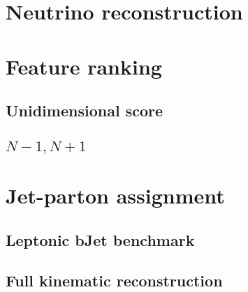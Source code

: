\label{sec:kin}
\minitoc

\section{Neutrino reconstruction}
\section{Feature ranking}
\subsection{Unidimensional score}
\subsection{{$N-1,N+1$}}
\section{Jet-parton assignment}
\subsection{Leptonic bJet benchmark}
\subsection{Full kinematic reconstruction}


